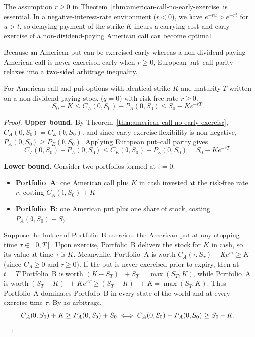 \begin{remark}
    The assumption $r \ge 0$ in Theorem~\ref{thm:american-call-no-early-exercise} is essential. In a negative-interest-rate environment ($r < 0$), we have $e^{-ru} > e^{-rt}$ for $u > t$, so delaying payment of the strike $K$ incurs a carrying cost and early exercise of a non-dividend-paying American call can become optimal.
\end{remark}

Because an American put can be exercised early whereas a non-dividend-paying American call is never exercised early when $r \ge 0$, European put--call parity relaxes into a two-sided arbitrage inequality.

\begin{theorem}\label{thm:american-put-call-inequality}
    For American call and put options with identical strike $K$ and maturity $T$ written on a non-dividend-paying stock ($q = 0$) with risk-free rate $r \ge 0$,
    \begin{equation}\label{eq:american-put-call-ineq}
        S_0 - K \le C_A(0, S_0) - P_A(0, S_0) \le S_0 - K e^{-rT}.
    \end{equation}
\end{theorem}
\begin{proof}
    \textbf{Upper bound.} By Theorem~\ref{thm:american-call-no-early-exercise}, $C_A(0, S_0) = C_E(0, S_0)$, and since early-exercise flexibility is non-negative, $P_A(0, S_0) \ge P_E(0, S_0)$. Applying European put--call parity gives
    \[
    C_A(0, S_0) - P_A(0, S_0) \le C_E(0, S_0) - P_E(0, S_0) = S_0 - K e^{-rT}.
    \]

    \textbf{Lower bound.} Consider two portfolios formed at $t = 0$:
    \begin{itemize}
        \item \textbf{Portfolio~A}: one American call plus $K$ in cash invested at the risk-free rate $r$, costing $C_A(0, S_0) + K$.
        \item \textbf{Portfolio~B}: one American put plus one share of stock, costing $P_A(0, S_0) + S_0$.
    \end{itemize}
    Suppose the holder of Portfolio~B exercises the American put at any stopping time $\tau \in [0, T]$. Upon exercise, Portfolio~B delivers the stock for $K$ in cash, so its value at time $\tau$ is $K$. Meanwhile, Portfolio~A is worth $C_A(\tau, S_\tau) + K e^{r\tau} \ge K$ (since $C_A \ge 0$ and $r \ge 0$). If the put is never exercised prior to expiry, then at $t = T$ Portfolio~B is worth $(K - S_T)^+ + S_T = \max(S_T, K)$, while Portfolio~A is worth $(S_T - K)^+ + K e^{rT} \ge (S_T - K)^+ + K = \max(S_T, K)$. Thus Portfolio~A dominates Portfolio~B in every state of the world and at every exercise time $\tau$. By no-arbitrage,
    \[
    C_A(0, S_0) + K \ge P_A(0, S_0) + S_0 \iff C_A(0, S_0) - P_A(0, S_0) \ge S_0 - K. \qedhere
    \]
\end{proof}

